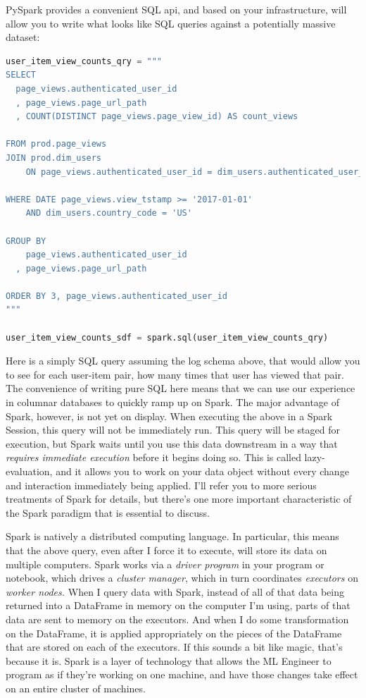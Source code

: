 PySpark provides a convenient SQL api, and based on your infrastructure, will allow you to write what looks like SQL queries against a potentially massive dataset:

\begin{lstlisting}[language=Python]
user_item_view_counts_qry = """
SELECT 
  page_views.authenticated_user_id
  , page_views.page_url_path
  , COUNT(DISTINCT page_views.page_view_id) AS count_views 

FROM prod.page_views
JOIN prod.dim_users 
	ON page_views.authenticated_user_id = dim_users.authenticated_user_id 

WHERE DATE page_views.view_tstamp >= '2017-01-01'
	AND dim_users.country_code = 'US'

GROUP BY 
	page_views.authenticated_user_id
  , page_views.page_url_path

ORDER BY 3, page_views.authenticated_user_id
"""

user_item_view_counts_sdf = spark.sql(user_item_view_counts_qry)
\end{lstlisting}

Here is a simply SQL query assuming the log schema above, that would allow you to see for each user-item pair, how many times that user has viewed that pair. The convenience of writing pure SQL here means that we can use our experience in columnar databases to quickly ramp up on Spark. The major advantage of Spark, however, is not yet on display. When executing the above in a Spark Session, this query will not be immediately run. This query will be staged for execution, but Spark waits until you use this data downstream in a way that \emph{requires immediate execution} before it begins doing so. This is called lazy-evaluation, and it allows you to work on your data object without every change and interaction immediately being applied. I'll refer you to more serious treatments of Spark for details, but there's one more important characteristic of the Spark paradigm that is essential to discuss.

Spark is natively a distributed computing language. In particular, this means that the above query, even after I force it to execute, will store its data on multiple computers. Spark works via a \emph{driver program} in your program or notebook, which drives a \emph{cluster manager}, which in turn coordinates \emph{executors} on \emph{worker nodes.} When I query data with Spark, instead of all of that data being returned into a DataFrame in memory on the computer I'm using, parts of that data are sent to memory on the executors. And when I do some transformation on the DataFrame, it is applied appropriately on the pieces of the DataFrame that are stored on each of the executors. If this sounds a bit like magic, that's because it is. Spark is a layer of technology that allows the ML Engineer to program as if they're working on one machine, and have those changes take effect on an entire cluster of machines. 

